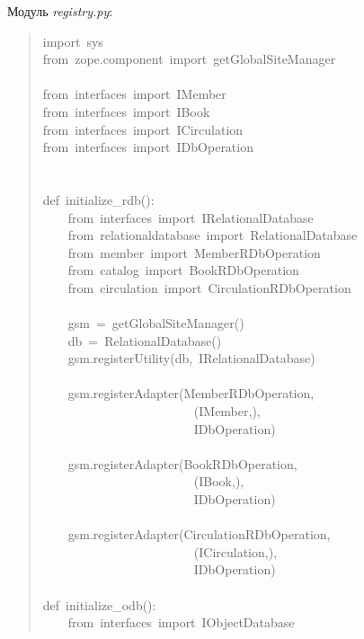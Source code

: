 \documentclass[a4paper,openany,twoside,final]{book}
\providecommand*{\DUroletitlereference}[1]{\textsl{#1}}
\begin{document}
Модуль \DUroletitlereference{registry.py}:

\begin{quote}{\ttfamily \raggedright \noindent
import~sys\\
from~zope.component~import~getGlobalSiteManager\\
~\\
from~interfaces~import~IMember\\
from~interfaces~import~IBook\\
from~interfaces~import~ICirculation\\
from~interfaces~import~IDbOperation\\
~\\
~\\
def~initialize\_rdb():\\
~~~~from~interfaces~import~IRelationalDatabase\\
~~~~from~relationaldatabase~import~RelationalDatabase\\
~~~~from~member~import~MemberRDbOperation\\
~~~~from~catalog~import~BookRDbOperation\\
~~~~from~circulation~import~CirculationRDbOperation\\
~\\
~~~~gsm~=~getGlobalSiteManager()\\
~~~~db~=~RelationalDatabase()\\
~~~~gsm.registerUtility(db,~IRelationalDatabase)\\
~\\
~~~~gsm.registerAdapter(MemberRDbOperation,\\
~~~~~~~~~~~~~~~~~~~~~~~~(IMember,),\\
~~~~~~~~~~~~~~~~~~~~~~~~IDbOperation)\\
~\\
~~~~gsm.registerAdapter(BookRDbOperation,\\
~~~~~~~~~~~~~~~~~~~~~~~~(IBook,),\\
~~~~~~~~~~~~~~~~~~~~~~~~IDbOperation)\\
~\\
~~~~gsm.registerAdapter(CirculationRDbOperation,\\
~~~~~~~~~~~~~~~~~~~~~~~~(ICirculation,),\\
~~~~~~~~~~~~~~~~~~~~~~~~IDbOperation)\\
~\\
def~initialize\_odb():\\
~~~~from~interfaces~import~IObjectDatabase\\
}
\end{quote}
\end{document}

